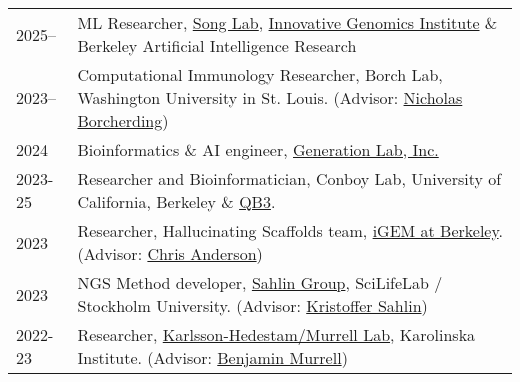 \begin{longtable}[l]{@{}p{} p{}}

    2025-- & ML Researcher, \href{https://people.eecs.berkeley.edu/~yss/}{Song Lab}, \href{https://innovativegenomics.org/people/yun-s-song/}{Innovative Genomics Institute} \& Berkeley Artificial Intelligence Research \\

    2023-- & Computational Immunology Researcher, Borch Lab, Washington University in St. Louis. (Advisor: \href{https://www.borch.dev/}{Nicholas Borcherding}) \\

    2024 & Bioinformatics \& AI engineer, \href{https://www.generationlab.com/}{Generation Lab, Inc.} \\

    2023-25 & Researcher and Bioinformatician, Conboy Lab, University of California, Berkeley \& \href{https://qb3.berkeley.edu/}{QB3}. \\

    2023 & Researcher, Hallucinating Scaffolds team, \href{https://igem.studentorg.berkeley.edu/teams/hallucinating-scaffolds/}{iGEM at Berkeley}. (Advisor: \href{https://vcresearch.berkeley.edu/faculty/chris-anderson}{Chris Anderson}) \\

    2023 & NGS Method developer, \href{https://sahlingroup.github.io/}{Sahlin Group}, SciLifeLab / Stockholm University. (Advisor: \href{https://www.scilifelab.se/researchers/kristoffer-sahlin/}{Kristoffer Sahlin}) \\

    2022-23 & Researcher, \href{https://ki.se/en/people/benjamin-murrell}{Karlsson-Hedestam/Murrell Lab}, Karolinska Institute. (Advisor: \href{https://ki.se/en/people/benjamin-murrell}{Benjamin Murrell})

\end{longtable}
